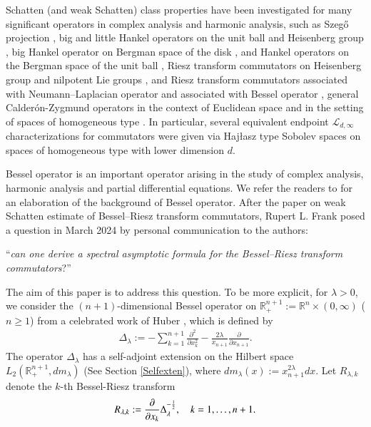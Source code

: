 \documentclass[12pt]{amsart}
\begin{document}
Schatten  (and weak Schatten) class properties have been investigated for many significant operators in complex analysis and harmonic analysis, such as Szeg\H{o} projection \cite{FR}, big and little Hankel operators on the unit ball and  Heisenberg group \cite{FR},  big Hankel operator on Bergman space of the disk  \cite{AFP}, and  Hankel operators on the Bergman space of the unit ball \cite{MR1087805}, Riesz transform commutators on Heisenberg group \cite{MR4552581} and nilpotent Lie groups \cite{MR4756021}, and Riesz transform commutators associated with  Neumann--Laplacian operator \cite{Neumann} and associated with Bessel operator \cite{FLLXarxiv}, general Calder\'{o}n-Zygmund operators in the context of Euclidean space \cite{Zhangwei1,Zhangwei2} and in the setting of spaces of homogeneous type \cite{HRpreprint}. In particular, several equivalent endpoint $\mathcal{L}_{d,\infty}$ characterizations \cite{HRpreprint} for commutators were given via Haj\l asz type Sobolev spaces on spaces of homogeneous type with lower dimension $d$.

Bessel operator is an important operator arising in the study of complex analysis, harmonic analysis and partial differential equations. We refer the readers to \cite{MR64284,MS} for an elaboration of the background of Bessel operator. After the paper  \cite{FLLXarxiv} on weak Schatten estimate of Bessel--Riesz transform commutators,
Rupert L. Frank posed a question in March 2024 by personal communication to the authors:

``{\it can one derive a spectral asymptotic formula for the Bessel--Riesz transform commutators}?''

The aim of this paper is to address this question. To be more explicit, for $\lambda> 0$, we consider the $(n+1)$-dimensional Bessel operator on $\mathbb{R}^{n+1}_+:=\mathbb{R}^n\times (0,\infty)$ ($n\geq 1$) from a celebrated work of Huber \cite{MR64284}, which is defined by
\begin{align}\label{Dlambda}
\Delta_\lambda:= -\sum_{k=1}^{n+1}\frac{\partial^2}{\partial x_k^2}-\frac{2\lambda}{x_{n+1}}\frac{\partial}{\partial x_{n+1}}.
\end{align}
The operator $\Delta_\lambda$ has a self-adjoint extension on the Hilbert space $L_2(\mathbb{R}_+^{n+1}, dm_\lambda)$ (See Section \ref{Selfexten}),  where $dm_\lambda(x):=x_{n+1}^{2\lambda}dx.$ Let $R_{\lambda,k}$ denote the $k$-th Bessel-Riesz transform %
$$ R_{\lambda,k} := {\partial\over \partial x_k} \Delta_\lambda^{-{1\over2}},\quad k=1,\ldots,n+1. $$
\end{document}
